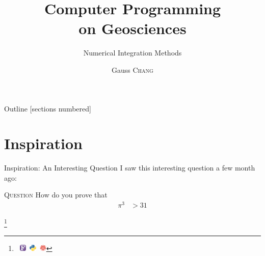\documentclass[10pt, xcolor = svgnames]{beamer} %
\title{Computer Programming \\ on Geosciences}
\author[Name]{Gauss \textsc{Chang}\inst{$\dagger$}} %
\subtitle{Numerical Integration Methods}
\institute[uni] %
{
	\inst{\dagger}
	Department of Physics \\
	\textsc{National Taiwan University}
}
\date{\DTMdate{2024-09-18}} %
\newcommand{\FORTRAN}[0]{~\includegraphics[height = 9.5pt]{./logos/Fortran.pdf}}
\newcommand{\PYTHON}[0]{~\includegraphics[height = 9.5pt]{./logos/Python.pdf}}
\newcommand{\MMA}[0]{~\includegraphics[height = 9.5pt]{./logos/Mathematica.pdf}}
\newcommand{\ALL}[0]{\FORTRAN\PYTHON\MMA}
\newcommand\blfootnote[1]{
  \begingroup
  \renewcommand\thefootnote{}\footnote{#1}
  \addtocounter{footnote}{-1}
  \endgroup
}
\begin{document}
{
\maketitle
}%





\begin{frame}{Outline}
  [sections numbered] %
  \tableofcontents[hideallsubsections] %
\end{frame}




%



\section{Inspiration}

\begin{frame}[fragile]{Inspiration: An Interesting Question}
I saw this interesting question a few month ago:

\begin{exampleblock}{\textsc{Question}}
How do you prove that
\begin{align}
	\pi^3
	&> 31
\end{align}
\end{exampleblock}
\blfootnote{\ALL}
\end{frame}
\end{document}
